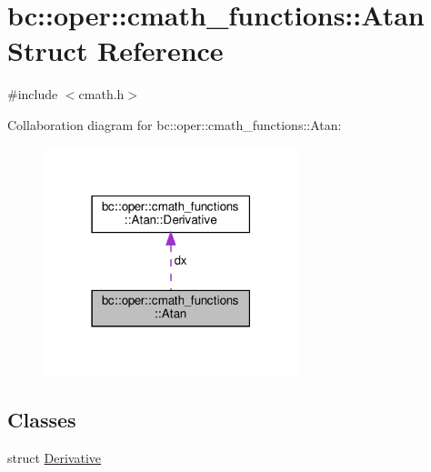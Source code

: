 \hypertarget{structbc_1_1oper_1_1cmath__functions_1_1Atan}{}\section{bc\+:\+:oper\+:\+:cmath\+\_\+functions\+:\+:Atan Struct Reference}
\label{structbc_1_1oper_1_1cmath__functions_1_1Atan}


{\ttfamily \#include $<$cmath.\+h$>$}



Collaboration diagram for bc\+:\+:oper\+:\+:cmath\+\_\+functions\+:\+:Atan\+:\nopagebreak
\begin{figure}[H]
\begin{center}
\leavevmode
\includegraphics[width=210pt]{structbc_1_1oper_1_1cmath__functions_1_1Atan__coll__graph}
\end{center}
\end{figure}
\subsection*{Classes}
\begin{DoxyCompactItemize}
\item 
struct \hyperlink{structbc_1_1oper_1_1cmath__functions_1_1Atan_1_1Derivative}{Derivative}
\end{DoxyCompactItemize}
